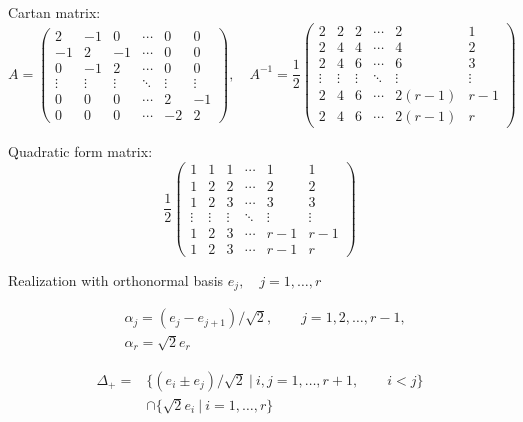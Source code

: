 \documentclass[12pt]{article}
\begin{document}
Cartan matrix:
\[
A=\left(
\begin{array}{cccccc}
 2 & -1& 0 &\cdots & 0 & 0 \\
 -1& 2 & -1 &\cdots & 0 & 0 \\
 0 & -1 & 2 &\cdots & 0 & 0 \\
  \vdots&\vdots &\vdots &\ddots &\vdots &\vdots \\
 0&0 &0 &\cdots & 2& -1\\
 0&0 &0 &\cdots & -2& 2
\end{array}
\right)
,\quad
A^{-1}=\frac{1}{2}
\left(
\begin{array}{cccccc}
 2& 2& 2 &\cdots & 2 & 1 \\
 2& 4 & 4 &\cdots & 4 & 2 \\
 2& 4 & 6 &\cdots & 6 & 3 \\
  \vdots&\vdots &\vdots &\ddots &\vdots &\vdots \\
 2&4 &6 &\cdots & 2(r-1)& r-1\\
 2&4 &6 &\cdots & 2(r-1)& r
\end{array}
\right)
\]

Quadratic form matrix:
\[\frac{1}{2}
\left(
\begin{array}{cccccc}
 1& 1& 1 &\cdots & 1 & 1 \\
 1& 2 & 2 &\cdots & 2 & 2 \\
 1& 2 & 3 &\cdots & 3 & 3 \\
  \vdots&\vdots &\vdots &\ddots &\vdots &\vdots \\
 1&2 &3 &\cdots & r-1& r-1\\
 1&2 &3 &\cdots & r-1& r
\end{array}
\right)
\]

Realization with orthonormal basis $e_j,\quad j=1,\dots,r$

\begin{align*}
  &\alpha_{j}=(e_j-e_{j+1})/\sqrt{2},\qquad j=1,2,\dots,r-1,\\
  &\alpha_{r}=\sqrt{2} e_r
\end{align*}

\begin{align*}
 \Delta_{+}=&\{(e_i \pm e_j)/\sqrt{2}\ |\ i,j=1,\dots,r+1,\qquad i<j\} \\
      &\cap
       \{ \sqrt{2}e_{i}\ |\ i=1,\dots,r\}
\end{align*}
\newpage

%
\end{document}

